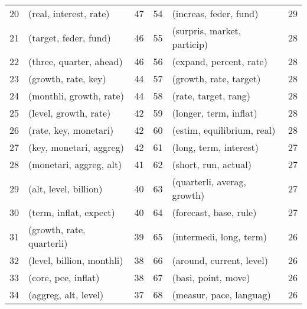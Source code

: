 \begin{tabular}{rlrrlr}
 20 &      (real, interest, rate) &     47 &  54 &       (increas, feder, fund) &     29 \\
 21 &       (target, feder, fund) &     46 &  55 &  (surpris, market, particip) &     28 \\
 22 &     (three, quarter, ahead) &     46 &  56 &      (expand, percent, rate) &     28 \\
 23 &         (growth, rate, key) &     44 &  57 &       (growth, rate, target) &     28 \\
 24 &     (monthli, growth, rate) &     44 &  58 &         (rate, target, rang) &     28 \\
 25 &       (level, growth, rate) &     42 &  59 &       (longer, term, inflat) &     28 \\
 26 &       (rate, key, monetari) &     42 &  60 &   (estim, equilibrium, real) &     28 \\
 27 &     (key, monetari, aggreg) &     42 &  61 &       (long, term, interest) &     27 \\
 28 &     (monetari, aggreg, alt) &     41 &  62 &         (short, run, actual) &     27 \\
 29 &       (alt, level, billion) &     40 &  63 &  (quarterli, averag, growth) &     27 \\
 30 &      (term, inflat, expect) &     40 &  64 &       (forecast, base, rule) &     27 \\
 31 &   (growth, rate, quarterli) &     39 &  65 &      (intermedi, long, term) &     26 \\
 32 &   (level, billion, monthli) &     38 &  66 &     (around, current, level) &     26 \\
 33 &         (core, pce, inflat) &     38 &  67 &          (basi, point, move) &     26 \\
 34 &        (aggreg, alt, level) &     37 &  68 &      (measur, pace, languag) &     26 \\
\bottomrule
\end{tabular}
